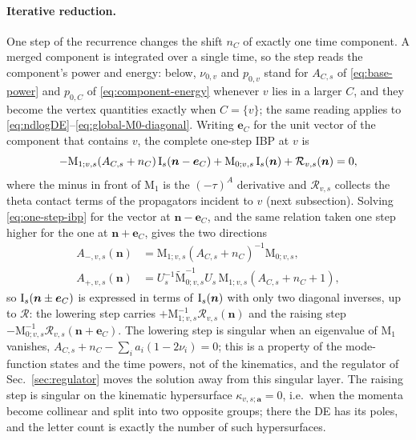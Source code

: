 \documentclass[11pt,a4paper]{article}
\numberwithin{table}{section}
\newcommand{\cR}{\mathcal R}
\begin{document}
\paragraph{Iterative reduction.}
\label{sec:iterative}
One step of the recurrence changes the shift $n_C$ of exactly one time component. A merged
component is integrated over a single time, so the step reads the component's power and
energy: below, $\nu_{0,v}$ and $p_{0,v}$ stand for $A_{C,s}$ of \eqref{eq:base-power} and
$p_{0,C}$ of \eqref{eq:component-energy} whenever $v$ lies in a larger $C$, and they become
the vertex quantities exactly when $C=\{v\}$; the same reading applies to
\eqref{eq:ndlogDE}--\eqref{eq:global-M0-diagonal}. Writing $\bm e_C$ for the
unit vector of the component that contains $v$, the complete one-step IBP at $v$ is
\begin{equation}
  -\text{M}_{1;v,s}(A_{C,s}+n_C)\,\bm{\text I}_s(\bm n-\bm e_C)
  +\text{M}_{0;v,s}\,\bm{\text I}_s(\bm n)
  +\cR_{v,s}(\bm n)=0,
  \label{eq:one-step-ibp}
\end{equation}
where the minus in front of $\text{M}_1$ is the $(-\tau)^A$ derivative and $\cR_{v,s}$ collects the
theta contact terms of the propagators incident to $v$ (next subsection). Solving
\eqref{eq:one-step-ibp} for the vector at $\bm n-\bm e_C$, and the same relation taken one step
higher for the one at $\bm n+\bm e_C$, gives the two directions
\begin{align}
  A_{-,v,s}(\bm n)&=\text{M}_{1;v,s}(A_{C,s}+n_C)^{-1}\text{M}_{0;v,s},
  \label{eq:global-Aminus}\\
  A_{+,v,s}(\bm n)&=U_s^{-1}\widetilde{\text{M}}_{0;v,s}^{-1}U_s\,
  \text{M}_{1;v,s}(A_{C,s}+n_C+1),
  \label{eq:global-Aplus}
\end{align}
so $\bm{\text I}_s(\bm n\pm\bm e_C)$ is expressed in terms of $\bm{\text I}_s(\bm n)$ with only two
diagonal inverses, up to $\cR$: the lowering step carries $+\text{M}_{1;v,s}^{-1}\cR_{v,s}(\bm n)$
and the raising step
$-\text{M}_{0;v,s}^{-1}\cR_{v,s}(\bm n+\bm e_C)$. The lowering step is singular when an eigenvalue of $\text{M}_1$ vanishes,
$A_{C,s}+n_C-\sum_ia_i(1-2\nu_i)=0$; this is a property of the mode-function states and the time
powers, not of the kinematics, and the regulator of Sec.~\ref{sec:regulator} moves the solution away
from this singular layer. The raising
step is singular on the kinematic hypersurface $\kappa_{v,s;\bm a}=0$, i.e.\ when the momenta
become collinear and split into two opposite groups; there the DE has its poles, and the letter
count is exactly the number of such hypersurfaces.
\end{document}
